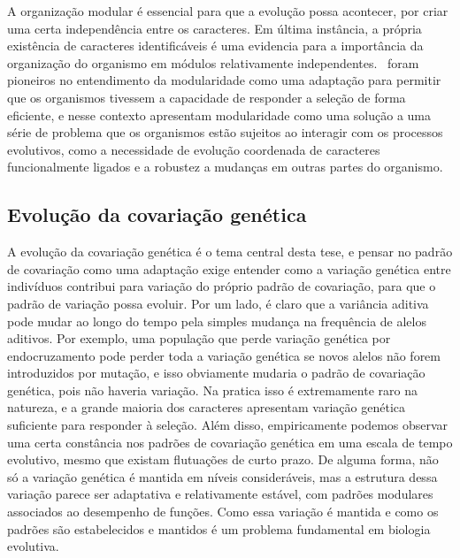 \begin{refsection}
A organização modular é essencial para que a evolução possa acontecer, por
criar uma certa independência entre os caracteres. Em última instância, a
própria existência de caracteres identificáveis é uma evidencia para a
importância da organização do organismo em módulos relativamente
independentes.~\textcite{Wagner1996-ui} foram pioneiros no entendimento da
modularidade como uma adaptação para permitir que os organismos tivessem a
capacidade de responder a seleção de forma eficiente, e nesse contexto apresentam
modularidade como uma solução a uma série de problema que os organismos estão
sujeitos ao interagir com os processos evolutivos, como a necessidade de
evolução coordenada de caracteres funcionalmente ligados e a robustez a
mudanças em outras partes do organismo.

\subsection{Evolução da covariação genética}

A evolução da covariação genética é o tema central desta tese, e pensar no
padrão de covariação como uma adaptação exige entender como a variação
genética entre indivíduos contribui para variação do próprio padrão de
covariação, para que o padrão de variação possa evoluir. Por um lado, é claro
que a variância aditiva pode mudar ao longo do tempo pela simples mudança na
frequência de alelos aditivos. Por exemplo, uma população que perde variação
genética por endocruzamento pode  perder toda a variação genética se novos
alelos não forem introduzidos por mutação, e isso obviamente mudaria o padrão
de covariação genética, pois não haveria variação. Na pratica isso é
extremamente raro na natureza, e a grande maioria dos caracteres apresentam
variação genética suficiente para responder à seleção. Além disso,
empiricamente podemos observar uma certa constância nos padrões de covariação
genética em uma escala de tempo evolutivo, mesmo que existam flutuações de
curto prazo. De alguma forma, não só a variação genética é mantida em níveis
consideráveis, mas a estrutura dessa variação parece ser adaptativa e
relativamente estável, com padrões modulares associados ao desempenho de
funções. Como essa variação é mantida e como os padrões são estabelecidos e
mantidos é um problema fundamental em biologia evolutiva.


\end{refsection}
